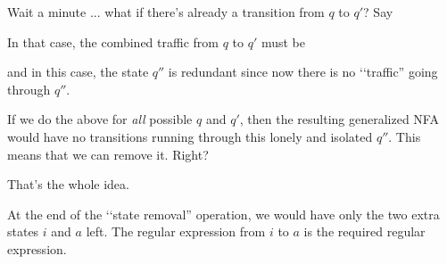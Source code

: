 Wait a minute ... what if there's already a transition from 
$q$ to $q'$? Say
\begin{center}
\end{center}
In that case, the combined traffic from $q$ to $q'$ must be 
\begin{center}
\end{center}
and in this case, the state $q''$ is redundant since now there is no
\lq\lq traffic'' going through $q''$.

If we do the above for
\textit{all} possible $q$ and $q'$, then
the resulting generalized NFA would have no transitions running through
this lonely and isolated $q''$.
This means that we can remove it.
Right?

That's the whole idea.

At the end of the \lq\lq state removal'' operation,
we would have only the two extra states $i$ and $a$ left.
The regular expression from $i$ to $a$ is the required regular expression.

